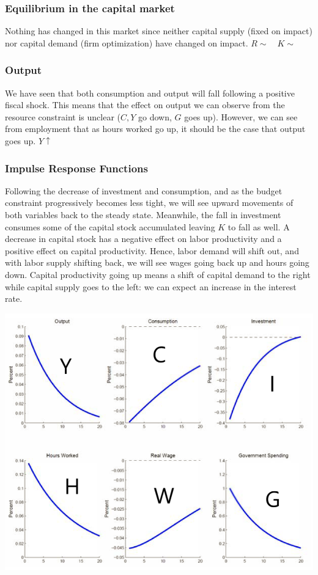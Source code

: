 \documentclass[12pt]{report}
\begin{document}
\subsubsection{Equilibrium in the capital market}

Nothing has changed in this market since neither capital supply (fixed on impact) nor capital demand (firm optimization) have changed on impact. $R\sim \quad K \sim$

\subsubsection{Output}

We have seen that both consumption and output will fall following a positive fiscal shock. This means that the effect on output we can observe from the resource constraint is unclear ($C, Y$ go down, $G$ goes up). However, we can see from employment that as hours worked go up, it should be the case that output goes up. $Y\uparrow$

\subsubsection{Impulse Response Functions}

Following the decrease of investment and consumption, and as the budget constraint progressively becomes less tight, we will see upward movements of both variables back to the steady state. Meanwhile, the fall in investment consumes some of the capital stock accumulated leaving $K$ to fall as well. A decrease in capital stock has a negative effect on labor productivity and a positive effect on capital productivity. Hence, labor demand will shift out, and with labor supply shifting back, we will see wages going back up and hours going down. Capital productivity going up means a shift of capital demand to the right while capital supply goes to the left: we can expect an increase in the interest rate.

\begin{center}
\includegraphics[scale=0.55]{images/RBC2-gshock.png} 
\end{center}
\end{document}
